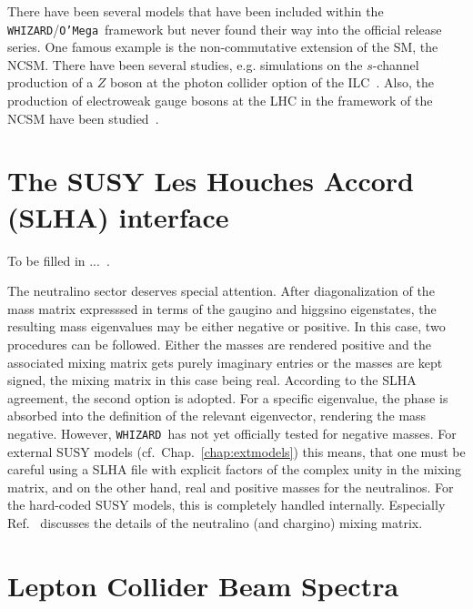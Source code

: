 \documentclass[12pt]{book}
\newcommand{\ttt}[1]{\texttt{#1}}
\newcommand{\whizard}{\ttt{WHIZARD}}
\newcommand{\oMega}{\ttt{O'Mega}}
\begin{document}
There have been several models that have been included within the
\whizard/\oMega\ framework but never found their way into the official
release series. One famous example is the non-commutative extension of
the SM, the NCSM. There have been several studies, e.g. simulations on
the $s$-channel production of a $Z$ boson at the photon collider
option of the ILC~\cite{Ohl:2004tn}. Also, the production of
electroweak gauge bosons at the LHC in the framework of the NCSM have
been studied~\cite{Ohl:2010zf}.



\section{The SUSY Les Houches Accord (SLHA) interface}
\label{sec:slha}


To be filled in
...~\cite{Skands:2003cj,AguilarSaavedra:2005pw,Allanach:2008qq}.

The neutralino sector deserves special attention. After
diagonalization of the mass matrix expresssed in terms
of the gaugino and higgsino eigenstates, the resulting mass
eigenvalues may be either negative or positive. In this case, two
procedures can be followed.  Either the masses are rendered
positive and the associated mixing matrix gets purely imaginary
entries or the masses are kept signed, the mixing matrix in this case
being real.  According to the SLHA agreement, the second option is
adopted. For a specific eigenvalue, the phase is absorbed into the
definition of the relevant eigenvector, rendering the mass
negative. However, \whizard\ has not yet officially tested for
negative masses. For external SUSY models
(cf.~Chap.~\ref{chap:extmodels}) this means, that one must be careful
using a SLHA file with explicit factors of
the complex unity in the mixing matrix, and on the other hand,
real and positive masses for the neutralinos. For the hard-coded SUSY
models, this is completely handled internally. Especially
Ref.~\cite{Hagiwara:2005wg} discusses the details of the neutralino
(and chargino) mixing matrix.


\section{Lepton Collider Beam Spectra}
\label{sec:beamspectra}
\end{document}
